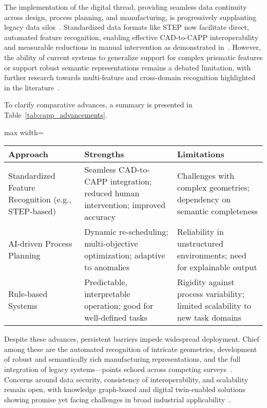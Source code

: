 \documentclass[sigconf]{acmart}
\begin{document}
The implementation of the digital thread, providing seamless data continuity across design, process planning, and manufacturing, is progressively supplanting legacy data silos~\cite{ref11,ref51}. Standardized data formats like STEP now facilitate direct, automated feature recognition, enabling effective CAD-to-CAPP interoperability and measurable reductions in manual intervention as demonstrated in~\cite{ref51,ref60}. However, the ability of current systems to generalize support for complex prismatic features or support robust semantic representations remains a debated limitation, with further research towards multi-feature and cross-domain recognition highlighted in the literature~\cite{ref60}.

To clarify comparative advances, a summary is presented in Table~\ref{tab:capp_advancements}.

\begin{table*}[htbp]
\centering
\caption{Comparative Advances in Automated Process Planning}
\label{tab:capp_advancements}
\begin{adjustbox}{max width=\textwidth}
\begin{tabular}{lll}
\toprule
\textbf{Approach} & \textbf{Strengths} & \textbf{Limitations} \\
\midrule
Standardized Feature Recognition (e.g., STEP-based) & Seamless CAD-to-CAPP integration; reduced human intervention; improved accuracy & Challenges with complex geometries; dependency on semantic completeness \\
AI-driven Process Planning & Dynamic re-scheduling; multi-objective optimization; adaptive to anomalies & Reliability in unstructured environments; need for explainable output \\
Rule-based Systems & Predictable, interpretable operation; good for well-defined tasks & Rigidity against process variability; limited scalability to new task domains \\
\bottomrule
\end{tabular}
\end{adjustbox}
\end{table*}

Despite these advances, persistent barriers impede widespread deployment. Chief among these are the automated recognition of intricate geometries, development of robust and semantically rich manufacturing representations, and the full integration of legacy systems—points echoed across competing surveys~\cite{ref16,ref18,ref44}. Concerns around data security, consistency of interoperability, and scalability remain open, with knowledge graph-based and digital twin-enabled solutions showing promise yet facing challenges in broad industrial applicability~\cite{ref44,ref59}.
\end{document}

